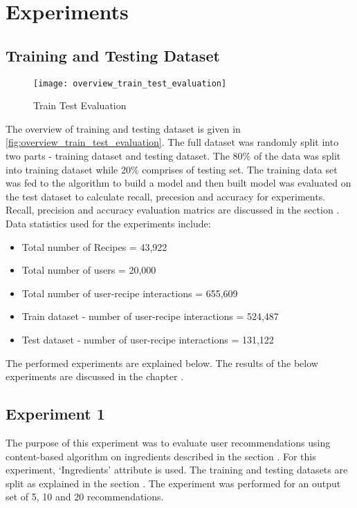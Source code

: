 \section{Experiments}

\subsection{Training and Testing Dataset}
\label{sec:traintest}
\begin{singlespace}
\begin{figure}[H]
	\centering
	\texttt{[image: overview\_train\_test\_evaluation]}
	\caption{Train Test Evaluation }
	\label{fig:overview_train_test_evaluation}
\end{figure}  
\end{singlespace}
The overview of training and testing dataset is given in \autoref{fig:overview_train_test_evaluation}. The full dataset was randomly split into
two parts - training dataset and testing dataset. The 80\% of the data was split into training dataset while 20\% comprises of testing set.  
The training data set was fed to the algorithm to build a model and then built model was evaluated on the test dataset to calculate recall, precesion and accuracy for experiments. Recall, precision and accuracy evaluation matrics are discussed in the section . \\
Data statistics used for the experiments include:
\begin{itemize}
\item Total number of Recipes = 43,922
\item Total number of users = 20,000
\item Total number of user-recipe interactions =  655,609
\item Train dataset - number of user-recipe interactions = 524,487
\item Test dataset - number of user-recipe interactions = 131,122
\end{itemize}
\noindent 
The performed experiments are explained below. The results of the below experiments are discussed in the chapter .
\subsection{Experiment 1}
\label{sec:cb_ingred_exp}
The purpose of this experiment was to evaluate user recommendations using content-based algorithm on ingredients described in the section . For this experiment, \lq{}Ingredients\rq{} attribute is used. The training and testing datasets are split as explained in the section . The experiment was performed for an output set of 5, 10 and 20 recommendations. 

